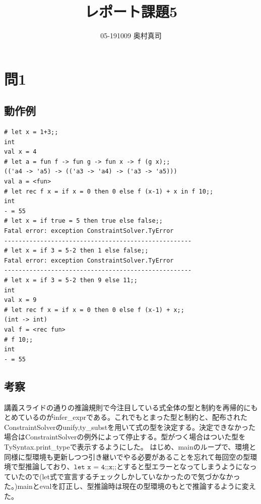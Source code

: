 \documentclass[11pt,a4paper]{jsarticle}
\title{レポート課題5}
\author{05-191009 奥村真司}
\date{}
\begin{document}
\maketitle
%
%
\section*{問1}
\subsection*{動作例}
\begin{lstlisting}[basicstyle=\ttfamily\footnotesize, frame=single]
# let x = 1+3;;  
int
val x = 4
# let a = fun f -> fun g -> fun x -> f (g x);;
(('a4 -> 'a5) -> (('a3 -> 'a4) -> ('a3 -> 'a5)))
val a = <fun>
# let rec f x = if x = 0 then 0 else f (x-1) + x in f 10;;
int
- = 55
# let x = if true = 5 then true else false;;
Fatal error: exception ConstraintSolver.TyError
----------------------------------------------------
# let x = if 3 = 5-2 then 1 else false;;
Fatal error: exception ConstraintSolver.TyError
----------------------------------------------------
# let x = if 3 = 5-2 then 9 else 11;; 
int
val x = 9
# let rec f x = if x = 0 then 0 else f (x-1) + x;;
(int -> int)
val f = <rec fun>
# f 10;;
int
- = 55
\end{lstlisting}
\subsection*{考察}
講義スライドの通りの推論規則で今注目している式全体の型と制約を再帰的にもとめているのがinfer\_exprである。これでもとまった型と制約と、配布されたConstraintSolverのunify,ty\_substを用いて式の型を決定する。決定できなかった場合はConstraintSolverの例外によって停止する。型がつく場合はついた型をTySyntax.print\_typeで表示するようにした。
はじめ、mainのループで、環境と同様に型環境も更新しつつ引き継いでやる必要があることを忘れて毎回空の型環境で型推論しており、$\texttt{let x = 4;;x;;}$とすると型エラーとなってしまうようになっていたので(let式で宣言するチェックしかしていなかったので気づかなかった。)mainとevalを訂正し、型推論時は現在の型環境のもとで推論するように変えた。
\end{document}

